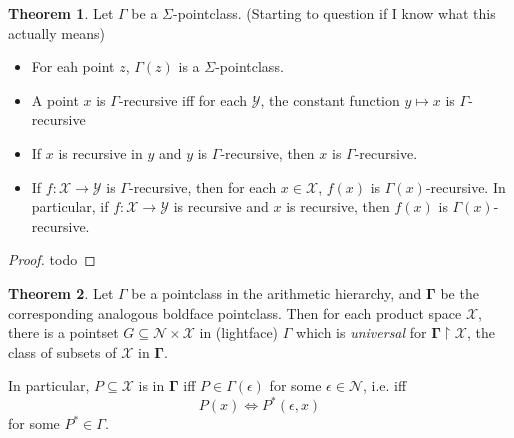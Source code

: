 \documentclass{article}
\theoremstyle{definition}
\newtheorem{theorem}{Theorem}[section]
\theoremstyle{plain}
\begin{document}
\begin{theorem}
    Let $\Gamma$ be a $\Sigma$-pointclass. (Starting to question if I know what this actually means)
    \begin{itemize}
        \item[(1)] For eah point $z$, $\Gamma(z)$ is a $\Sigma$-pointclass.
        \item[(2)] A point $x$ is $\Gamma$-recursive iff for each $\mathcal{Y}$, the constant function $y \mapsto x$ is $\Gamma$-recursive
        \item[(3)] If $x$ is recursive in $y$ and $y$ is $\Gamma$-recursive, then $x$ is $\Gamma$-recursive.
        \item[(4)] If $f:\mathcal{X} \to \mathcal{Y}$ is $\Gamma$-recursive, then for each $x \in \mathcal{X}$, $f(x)$ is $\Gamma(x)$-recursive. In particular, if $f:\mathcal{X} \to \mathcal{Y}$ is recursive and $x$ is recursive, then $f(x)$ is $\Gamma(x)$-recursive.
    \end{itemize}
\end{theorem}
\begin{proof}
    todo
\end{proof}
\begin{theorem}
    Let $\Gamma$ be a pointclass in the arithmetic hierarchy, and $\bm{\Gamma}$ be the corresponding analogous boldface pointclass. Then for each product space $\mathcal{X}$, there is a pointset $G \subseteq \mathcal{N} \times \mathcal{X}$ in (lightface) $\Gamma$ which is \textit{universal} for $\bm{\Gamma}\restriction \mathcal{X}$, the class of subsets of $\mathcal{X}$ in $\bm{\Gamma}$.
    \par In particular, $P \subseteq \mathcal{X}$ is in $\bm{\Gamma}$ iff $P \in \Gamma(\epsilon)$ for some $\epsilon \in \mathcal{N}$, i.e. iff
    \[ P(x) \iff P^*(\epsilon,x) \]
    for some $P^* \in \Gamma$.
\end{theorem}
\end{document}
